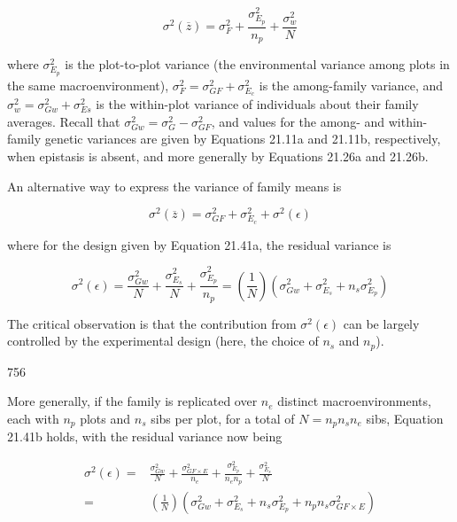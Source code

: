 \documentclass{article}
\begin{document}
\begin{equation}
\sigma^{2}(\overline{z})=\sigma_{F}^{2}+\frac{\sigma_{E_{p}}^{2}}{n_{p}}+\frac{\sigma_{w}^{2}}{N}
\tag{21.41a}
\label{eq:21_41a}
\end{equation}

where $\sigma_{E_p}^2$ is the plot-to-plot variance (the environmental variance among plots in the same macroenvironment), $\sigma_F^2 = \sigma_{GF}^2 + \sigma_{E_c}^2$ is the among-family variance, and $\sigma_w^2 = \sigma_{Gw}^2 + \sigma_{Es}^2$ is the within-plot variance of individuals about their family averages. Recall that $\sigma_{Gw}^2 = \sigma_G^2 - \sigma_{GF}^2$, and values for the among- and within-family genetic variances are given by Equations 21.11a and 21.11b, respectively, when epistasis is absent, and more generally by Equations 21.26a and 21.26b.

An alternative way to express the variance of family means is

\begin{equation}
\sigma^{2}(\overline{{z}})=\sigma_{G F}^{2}+\sigma_{E_{c}}^{2}+\sigma^{2}(\epsilon)
\tag{21.41b}
\label{eq:21_41b}
\end{equation}

where for the design given by Equation 21.41a, the residual variance is

\begin{equation}
\sigma^{2}(\epsilon)=\frac{\sigma_{G w}^{2}}{N}+\frac{\sigma_{E_{s}}^{2}}{N}+\frac{\sigma_{E_{p}}^{2}}{n_{p}}=\left(\frac{1}{N}\right)\left(\sigma_{G w}^{2}+\sigma_{E_{s}}^{2}+n_{s}\sigma_{E_{p}}^{2}\right)
\tag{21.41c}
\label{eq:21_41c}
\end{equation}

The critical observation is that the contribution from  $ \sigma^{2}(\epsilon) $ can be largely controlled by the experimental design (here, the choice of  $ n_{s} $ and  $ n_{p} $).

756

More generally, if the family is replicated over  $ n_e $ distinct macroenvironments, each with  $ n_p $ plots and  $ n_s $ sibs per plot, for a total of  $ N = n_p n_s n_e $ sibs, Equation 21.41b holds, with the residual variance now being

\begin{equation}
\begin{aligned}\sigma^{2}(\epsilon)=&\frac{\sigma_{Gw}^{2}}{N}+\frac{\sigma_{GF\times E}^{2}}{n_{e}}+\frac{\sigma_{E_{p}}^{2}}{n_{e}n_{p}}+\frac{\sigma_{E_{s}}^{2}}{N}\\=&\left(\frac{1}{N}\right)\left(\sigma_{Gw}^{2}+\sigma_{E_{s}}^{2}+n_{s}\sigma_{E_{p}}^{2}+n_{p}n_{s}\sigma_{GF\times E}^{2}\right)\end{aligned}
\tag{21.42a}
\label{eq:21_42a}
\end{equation}
\end{document}
